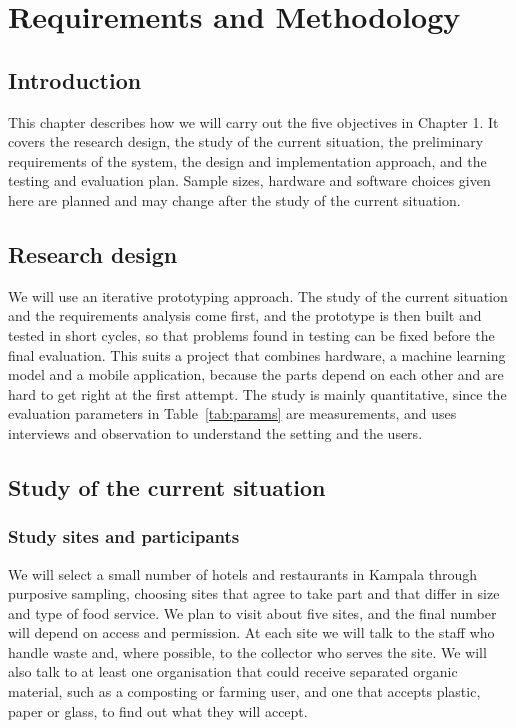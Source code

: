 \documentclass[12pt,a4paper]{report}
\begin{document}
\chapter{Requirements and Methodology}

\section{Introduction}

This chapter describes how we will carry out the five objectives in Chapter 1. It covers the research design, the study of the current situation, the preliminary requirements of the system, the design and implementation approach, and the testing and evaluation plan. Sample sizes, hardware and software choices given here are planned and may change after the study of the current situation.

\section{Research design}

We will use an iterative prototyping approach. The study of the current situation and the requirements analysis come first, and the prototype is then built and tested in short cycles, so that problems found in testing can be fixed before the final evaluation. This suits a project that combines hardware, a machine learning model and a mobile application, because the parts depend on each other and are hard to get right at the first attempt. The study is mainly quantitative, since the evaluation parameters in Table~\ref{tab:params} are measurements, and uses interviews and observation to understand the setting and the users.

\section{Study of the current situation}

\subsection{Study sites and participants}

We will select a small number of hotels and restaurants in Kampala through purposive sampling, choosing sites that agree to take part and that differ in size and type of food service. We plan to visit about five sites, and the final number will depend on access and permission. At each site we will talk to the staff who handle waste and, where possible, to the collector who serves the site. We will also talk to at least one organisation that could receive separated organic material, such as a composting or farming user, and one that accepts plastic, paper or glass, to find out what they will accept.
\end{document}
